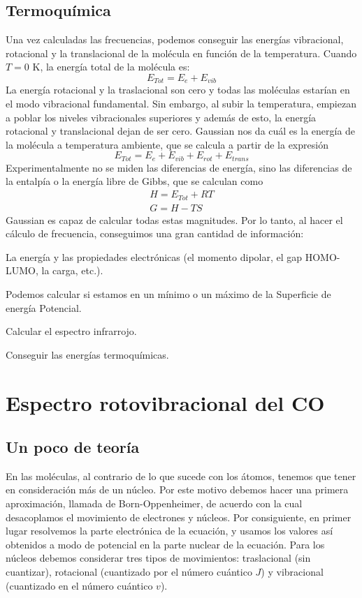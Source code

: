 \documentclass{tufte-book}
\begin{document}
\section{Termoquímica}
Una vez calculadas las frecuencias, podemos conseguir las
energías vibracional, rotacional y la translacional de la 
molécula en función de la temperatura. Cuando $T=0$ K, la 
energía total de la molécula es:
\begin{equation}
    E_{Tot} = E_e+E_{vib}
\end{equation}
La energía rotacional y la traslacional son cero y todas las 
moléculas estarían en el modo vibracional fundamental. Sin
embargo, al subir la temperatura, empiezan a poblar los niveles
vibracionales superiores y además de esto, la energía rotacional
y translacional dejan de ser cero. Gaussian nos da cuál es la
energía de la molécula a temperatura ambiente, que se calcula a partir de la expresión
\begin{equation}
    E_{Tot} = E_e+E_{vib}+E_{rot}+E_{trans}
\end{equation}
Experimentalmente no se miden las diferencias de energía, sino
las diferencias de la entalpía o la energía libre de Gibbs, que se calculan como
\begin{gather}
    H = E_{Tot}+RT \\
    G = H-TS
\end{gather}
Gaussian es capaz de calcular todas estas magnitudes. Por lo
tanto, al hacer el cálculo de frecuencia, conseguimos una gran
cantidad de información:
\begin{list}{\textbullet}
\item La energía y las propiedades electrónicas (el momento
dipolar, el gap HOMO-LUMO, la carga, etc.).
\item Podemos calcular si estamos en un mínimo o un máximo 
de la Superficie de energía Potencial.
\item Calcular el espectro infrarrojo.
\item Conseguir las energías termoquímicas.
\end{list}

\chapter{Espectro rotovibracional del CO}
\section{Un poco de teoría}
En las moléculas, al contrario de lo que sucede con los 
átomos, tenemos que tener en consideración más de un 
núcleo. Por este motivo debemos hacer una primera 
aproximación, llamada de Born-Oppenheimer, de acuerdo 
con la cual desacoplamos el movimiento de electrones y 
núcleos. Por consiguiente, en primer lugar resolvemos 
la parte electrónica de la ecuación,
y usamos los valores así obtenidos a modo de potencial en la
parte nuclear de la ecuación. Para los núcleos debemos 
considerar tres tipos de movimientos: traslacional (sin
cuantizar), rotacional (cuantizado por el número cuántico $J$)
y vibracional (cuantizado en el número cuántico $v$).
\end{document}
